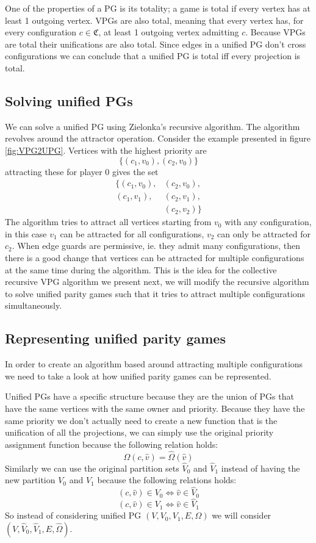 One of the properties of a PG is its totality; a game is total if every vertex has at least 1 outgoing vertex. VPGs are also total, meaning that every vertex has, for every configuration $c \in \mathfrak{C}$, at least 1 outgoing vertex admitting $c$. Because VPGs are total their unifications are also total. Since edges in a unified PG don't cross configurations we can conclude that a unified PG is total iff every projection is total.

\subsection{Solving unified PGs}
We can solve a unified PG using Zielonka's recursive algorithm. The algorithm revolves around the attractor operation. Consider the example presented in figure \ref{fig:VPG2UPG}. Vertices with the highest priority are 
\[ \{(c_1,v_0),(c_2,v_0)\}\]
attracting these for player $0$ gives the set 
\begin{align*}
\{(c_1,v_0),&(c_2,v_0),\\
(c_1,v_1),&(c_2,v_1),\\
 &(c_2,v_2)\}
\end{align*}
The algorithm tries to attract all vertices starting from $v_0$ with any configuration, in this case $v_1$ can be attracted for all configurations, $v_2$ can only be attracted for $c_2$. When edge guards are permissive, ie. they admit many configurations, then there is a good change that vertices can be attracted for multiple configurations at the same time during the algorithm. This is the idea for the collective recursive VPG algorithm we present next, we will modify the recursive algorithm to solve unified parity games such that it tries to attract multiple configurations simultaneously.

\subsection{Representing unified parity games}
In order to create an algorithm based around attracting multiple configurations we need to take a look at how unified parity games can be represented.


Unified PGs have a specific structure because they are the union of PGs that have the same vertices with the same owner and priority. Because they have the same priority we don't actually need to create a new function that is the unification of all the projections, we can simply use the original priority assignment function because the following relation holds:
\[ \Omega(c,\hat{v}) = \hat{\Omega}(\hat{v}) \]
Similarly we can use the original partition sets $\hat{V}_0$ and $\hat{V}_1$ instead of having the new partition $V_0$ and $V_1$ because the following relations holds:
\[ (c,\hat{v}) \in V_0 \iff \hat{v}\in \hat{V}_0 \]
\[ (c,\hat{v}) \in V_1 \iff \hat{v}\in \hat{V}_1 \]
So instead of considering unified PG $(V,V_0,V_1,E,\Omega)$ we will consider $(V,\hat{V}_0,\hat{V}_1,E,\hat{\Omega})$. 

